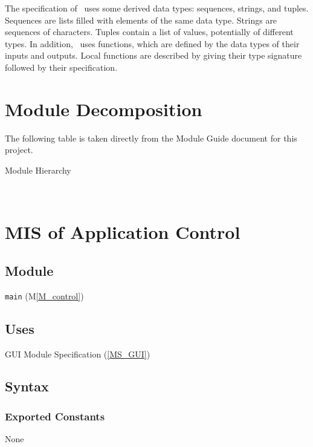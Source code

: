 \documentclass[12pt, titlepage]{article}
\newcommand{\mref}[1]{M\ref{#1}}
\newcommand{\mrefp}[1]{(\mref{#1})}
\newcommand{\msref}[1]{Module Specification (\ref{#1})}
\newcommand{\code}[1]{\texttt{#1}}
\begin{document}
\noindent
The specification of \progname \ uses some derived data types: sequences, strings, and
tuples. Sequences are lists filled with elements of the same data type. Strings
are sequences of characters. Tuples contain a list of values, potentially of
different types. In addition, \progname \ uses functions, which
are defined by the data types of their inputs and outputs. Local functions are
described by giving their type signature followed by their specification.

\newpage

\section{Module Decomposition}

The following table is taken directly from the Module Guide \cite{MG} document for this project.

\begin{table}[h!]
\centering

\caption{Module Hierarchy}
\label{TblMH}
\end{table}

~\newpage




\section{MIS of Application Control} \label{MS_control}

\subsection{Module}
\code{main} \mrefp{M_control}

\subsection{Uses}
GUI \msref{MS_GUI}

\subsection{Syntax}

\subsubsection{Exported Constants}
None
\end{document}
